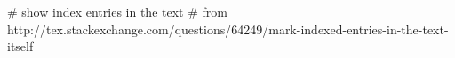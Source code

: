 # show index entries in the text
# from http://tex.stackexchange.com/questions/64249/mark-indexed-entries-in-the-text-itself

\makeatletter

\newcommand{\@theindexentry}[1]{%
  \smash{%
    \rlap{\rule{.4pt}{.8\baselineskip}}%
    \begin{lrbox}{\@tempboxa}\tiny\ttfamily#1\end{lrbox}%
    \rlap{\raisebox{.6\baselineskip}{\usebox{\@tempboxa}}}%
  }%
}

\renewcommand\imki@wrindexentrysplit[3]{%
  \expandafter\protected@write\csname#1@idxfile\endcsname{}%
    {\string\indexentry{#2}{#3}}%
    \@theindexentry{#1}%
}